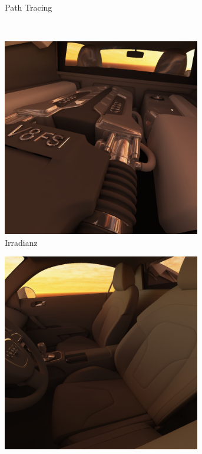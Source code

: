 \begin{figure}[h]
\begin{subfigure}[t]{0.5\textwidth}
				\caption{Path Tracing}
			\end{subfigure}
			\medskip \\
			\begin{subfigure}[t]{0.5\textwidth}
				\center
				\includegraphics[width=0.95\textwidth]{pic/irr_est-ra-r8_3-irr.png}
				\caption{Irradianz}
			\end{subfigure}
			\begin{subfigure}[t]{0.5\textwidth}
				\center
				\includegraphics[width=0.95\textwidth]{pic/irr_est-ra-r8_4-irr.png}

\end{subfigure}
\end{figure}
